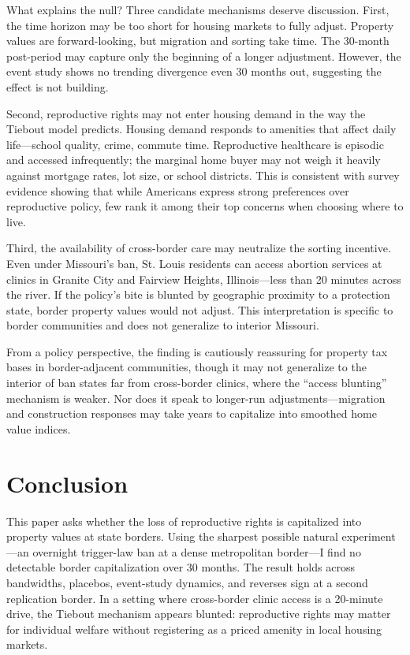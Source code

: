 \documentclass[12pt]{article}
\begin{document}
What explains the null? Three candidate mechanisms deserve discussion. First, the time horizon may be too short for housing markets to fully adjust. Property values are forward-looking, but migration and sorting take time. The 30-month post-period may capture only the beginning of a longer adjustment. However, the event study shows no trending divergence even 30 months out, suggesting the effect is not building.

Second, reproductive rights may not enter housing demand in the way the Tiebout model predicts. Housing demand responds to amenities that affect daily life---school quality, crime, commute time. Reproductive healthcare is episodic and accessed infrequently; the marginal home buyer may not weigh it heavily against mortgage rates, lot size, or school districts. This is consistent with survey evidence showing that while Americans express strong preferences over reproductive policy, few rank it among their top concerns when choosing where to live.

Third, the availability of cross-border care may neutralize the sorting incentive. Even under Missouri's ban, St. Louis residents can access abortion services at clinics in Granite City and Fairview Heights, Illinois---less than 20 minutes across the river. If the policy's bite is blunted by geographic proximity to a protection state, border property values would not adjust. This interpretation is specific to border communities and does not generalize to interior Missouri.

From a policy perspective, the finding is cautiously reassuring for property tax bases in border-adjacent communities, though it may not generalize to the interior of ban states far from cross-border clinics, where the ``access blunting'' mechanism is weaker. Nor does it speak to longer-run adjustments---migration and construction responses may take years to capitalize into smoothed home value indices.

\section{Conclusion}

This paper asks whether the loss of reproductive rights is capitalized into property values at state borders. Using the sharpest possible natural experiment---an overnight trigger-law ban at a dense metropolitan border---I find no detectable border capitalization over 30 months. The result holds across bandwidths, placebos, event-study dynamics, and reverses sign at a second replication border. In a setting where cross-border clinic access is a 20-minute drive, the Tiebout mechanism appears blunted: reproductive rights may matter for individual welfare without registering as a priced amenity in local housing markets.
\end{document}
